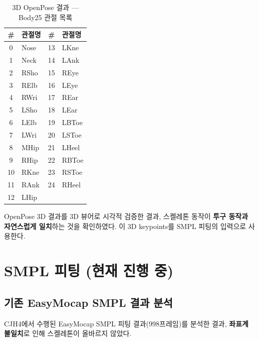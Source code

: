 \documentclass[11pt, a4paper]{report}
\begin{document}
\begin{table}[H]
\centering
\caption{3D OpenPose 결과 --- Body25 관절 목록}
\renewcommand{\arraystretch}{1.1}
\small
\begin{tabular}{cl|cl}
\toprule
\textbf{\#} & \textbf{관절명} & \textbf{\#} & \textbf{관절명} \\
\midrule
0 & Nose & 13 & LKne \\
1 & Neck & 14 & LAnk \\
2 & RSho & 15 & REye \\
3 & RElb & 16 & LEye \\
4 & RWri & 17 & REar \\
5 & LSho & 18 & LEar \\
6 & LElb & 19 & LBToe \\
7 & LWri & 20 & LSToe \\
8 & MHip & 21 & LHeel \\
9 & RHip & 22 & RBToe \\
10 & RKne & 23 & RSToe \\
11 & RAnk & 24 & RHeel \\
12 & LHip & & \\
\bottomrule
\end{tabular}
\end{table}

\begin{successbox}
OpenPose 3D 결과를 3D 뷰어로 시각적 검증한 결과,
스켈레톤 동작이 \textbf{투구 동작과 자연스럽게 일치}하는 것을 확인하였다.
이 3D keypoints를 SMPL 피팅의 입력으로 사용한다.
\end{successbox}


\chapter{SMPL 피팅 (현재 진행 중)}

\section{기존 EasyMocap SMPL 결과 분석}

CJH4에서 수행된 EasyMocap SMPL 피팅 결과(998프레임)를 분석한 결과,
\textbf{좌표계 불일치}로 인해 스켈레톤이 올바르지 않았다.
\end{document}
